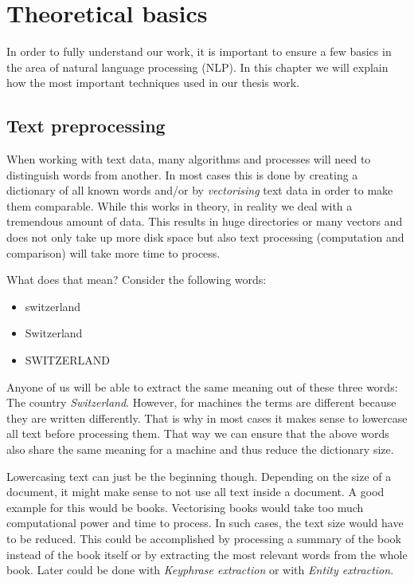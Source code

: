 \section{Theoretical basics}
In order to fully understand our work,
it is important to ensure a few basics in the area of natural language processing (NLP).
In this chapter we will explain how the most important techniques used in our thesis work.

\subsection{Text preprocessing}
\label{sec:text_preprocessing}

When working with text data, many algorithms and processes will need to distinguish words from another.
In most cases this is done by creating a dictionary of all known words and/or by \textit{vectorising} text data
in order to make them comparable.
While this works in theory, in reality we deal with a tremendous amount of data.
This results in huge directories or many vectors and does not only take up more disk space
but also text processing (computation and comparison) will take more time to process.

What does that mean?
Consider the following words:

\begin{itemize}
    \item switzerland
    \item Switzerland
    \item SWITZERLAND
\end{itemize}

Anyone of us will be able to extract the same meaning out of these three words: The country \textit{Switzerland}.
However, for machines the terms are different because they are written differently.
That is why in most cases it makes sense to lowercase all text before processing them.
That way we can ensure that the above words also share the same meaning for a machine and thus reduce the dictionary size.


Lowercasing text can just be the beginning though.
Depending on the size of a document, it might make sense to not use all text inside a document.
A good example for this would be books.
Vectorising books would take too much computational power and time to process.
In such cases, the text size would have to be reduced.
This could be accomplished by processing a summary of the book instead of the book itself
or by extracting the most relevant words from the whole book.
Later could be done with \textit{Keyphrase extraction} or with \textit{Entity extraction}.


